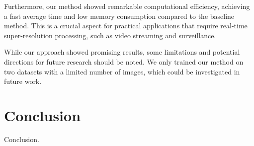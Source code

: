 \documentclass[10pt,twocolumn,letterpaper]{article}
\begin{document}
Furthermore, our method showed remarkable computational efficiency, achieving a fast average time and low memory consumption compared to the baseline method. This is a crucial aspect for practical applications that require real-time super-resolution processing, such as video streaming and surveillance.

While our approach showed promising results, some limitations and potential directions for future research should be noted. We only trained our method on two datasets with a limited number of images, which could be investigated in future work.


\section{Conclusion}
\label{sec:conclud}

Conclusion.


{\small


}
\end{document}
